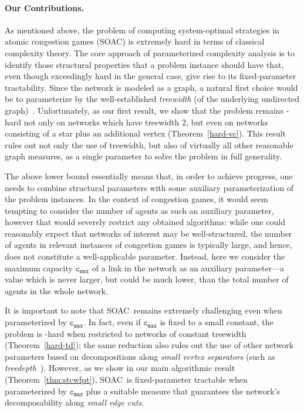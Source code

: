 \documentclass[letterpaper]{article} %
\newcommand{\problem}{{\sc SOAC}\xspace} %
\newcommand{\cmax}{\mathtt{c_{max}}}
\begin{document}
\paragraph{Our Contributions.}
As mentioned above, the problem of computing system-optimal strategies in atomic congestion games (\problem) is extremely hard in terms of classical complexity theory. The core approach of parameterized complexity analysis is to identify those structural properties that a problem instance should have that, even though exceedingly hard in the general case, give rise to its fixed-parameter tractability. Since the network is modeled as a graph, a natural first choice would be to parameterize by the well-established \emph{treewidth} (of the underlying undirected graph)~\cite{RobertsonS86}. Unfortunately, as our first result, we show that the problem remains \NP-hard not only on networks which have treewidth $2$, but even on networks consisting of a star plus an additional vertex (Theorem~\ref{hard-vc}). This result rules out not only the use of treewidth, but also of virtually all other reasonable graph measures, as a single parameter to solve the problem in full generality. 

The above lower bound essentially means that, in order to achieve progress, one needs to combine structural parameters with some auxiliary parameterization of the problem instances. In the context of congestion games, it would seem tempting to consider the number of agents as such an auxiliary parameter, however that would severely restrict any obtained algorithms: while one could reasonably expect that networks of interest may be well-structured, the number of agents in relevant instances of congestion games is typically large, and hence, does not constitute a well-applicable parameter. Instead, here we consider the maximum capacity $\cmax$ of a link in the network as an auxiliary parameter---a value which is never larger, but could be much lower, than the total number of agents in the whole network.

It is important to note that \problem\ remains extremely challenging even when parameterized by $\cmax$. In fact, even if $\cmax$ is fixed to a small constant, the problem is \NP-hard when restricted to networks of constant treewidth (Theorem~\ref{hard-td}); the same reduction also rules out the use of other network parameters based on decompositions along \emph{small vertex separators} (such as \emph{treedepth}~\cite{sparsity}).
However, as we show in our main algorithmic result (Theorem~\ref{thm:stcwfpt}), \problem\ is fixed-parameter tractable when parameterized by $\cmax$ plus a suitable measure that guarantees the network's decomposability along \emph{small edge cuts}. 
\end{document}

